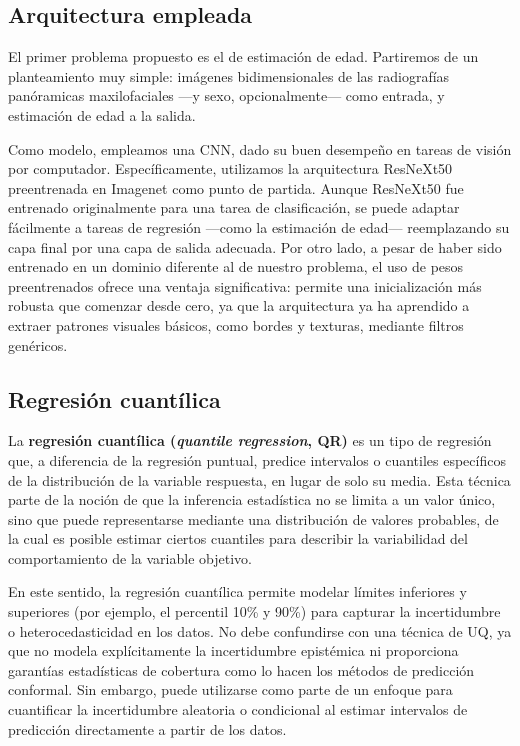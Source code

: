 \subsection{Arquitectura empleada}

El primer problema propuesto es el de estimación de edad. Partiremos de un planteamiento muy simple: imágenes 
bidimensionales de las radiografías panóramicas maxilofaciales ---y sexo, opcionalmente---
como entrada, y estimación de edad a la salida.

Como modelo, empleamos una CNN, dado su buen desempeño en tareas de visión por computador. Específicamente, utilizamos la arquitectura ResNeXt50 \cite{xie2017} preentrenada en Imagenet \cite{deng2009} como punto de partida. Aunque ResNeXt50 fue entrenado originalmente para una tarea de clasificación, se puede adaptar fácilmente a tareas de regresión ---como la estimación de edad--- reemplazando su capa final por una capa de salida adecuada. 
Por otro lado, a pesar de haber sido entrenado en un dominio diferente al de nuestro problema, el uso de pesos preentrenados ofrece una ventaja significativa: permite una inicialización más robusta que comenzar desde cero, ya que la arquitectura ya ha aprendido a extraer patrones visuales básicos, como bordes y texturas, mediante filtros genéricos.


\subsection{Regresión cuantílica}

La \textbf{regresión cuantílica (\textit{quantile regression}, QR)} es un tipo de regresión que, a diferencia de la regresión puntual, predice intervalos o cuantiles específicos de la distribución de la variable respuesta, en lugar de solo su media. Esta técnica parte de la noción de que la inferencia estadística no se limita a un valor único, sino que puede representarse mediante una distribución de valores probables, de la cual es posible estimar ciertos cuantiles para describir la variabilidad del comportamiento de la variable objetivo.

En este sentido, la regresión cuantílica permite modelar límites inferiores y superiores (por ejemplo, el percentil 10\% y 90\%) para capturar la incertidumbre o heterocedasticidad en los datos. No debe confundirse con una técnica de UQ, ya que no modela explícitamente la incertidumbre epistémica ni proporciona garantías estadísticas de cobertura como lo hacen los métodos de predicción conformal. Sin embargo, puede utilizarse como parte de un enfoque para cuantificar la incertidumbre aleatoria o condicional al estimar intervalos de predicción directamente a partir de los datos.

